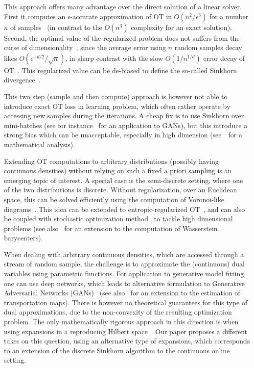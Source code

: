 This approach offers many advantage over the direct solution of a linear solver. First it computes an $\epsilon$-accurate approximation of OT in $O(n^2/\epsilon^3)$ for a number $n$ of samples~\cite{altschuler2017near} (in contrast to the $O(n^3)$ complexity for an exact solution). Second, the optimal value of the regularized problem does not suffers from the curse of dimensionality~\cite{2019-Genevay-aistats}, since the average error using $n$ random samples decay likes $O(\epsilon^{-d/2}/\sqrt{n})$, in sharp contrast with the slow $O(1/n^{1/d})$ error decay of OT~\cite{weed2019sharp}. This regularized value can be de-biased to define the so-called Sinkhorn divergence~\cite{2019-Feydy-aistats}.  

This two step (sample and then compute) approach is however not able to introduce exact OT loss in learning problem, which often rather operate by accessing new samples during the iterations. A cheap fix is to use Sinkhorn over mini-batches (see for instance~\cite{2018-Genevay-aistats} for an application to GANs), but this introduce a strong bias which can be unacceptable, especially in high dimension (see~\cite{fatras2019learning} for a mathematical analysis). 

Extending OT computations to arbitrary distributions (possibly having continuous densities) without relying on such a fixed a priori sampling is an emerging topic of interest. A special case is the semi-discrete setting, where one of the two distributions is discrete. Without regularization, over an Euclidean space, this can be solved efficiently using the computation of Voronoi-like diagrams~\cite{merigot2011multiscale}. This idea can be extended to entropic-regularized OT~\cite{cuturi2018semidual}, and can also be coupled with stochastic optimization method~\cite{2016-genevay-nips} to tackle high dimensional problems (see also~\cite{staib2017parallel} for an extension to the computation of Wasserstein barycenters). 

When dealing with arbitrary continuous densities, which are accessed through a stream of random sample, the challenge is to approximate  the (continuous) dual variables using parametric functions. For application to generative model fitting, one can use deep networks, which leads to alternative formulation to Generative Adversarial Networks (GANs)~\cite{arjovsky2017wgan} (see also~\cite{seguy2018large} for an extension to the estimation of transportation maps). 
%
There is however no theoretical guarantees for this type of dual approximations, due to the non-convexity of the resulting optimization problem. The only mathematically rigorous approach in this direction is when using expansions in a reproducing Hilbert space~\cite{2016-genevay-nips}. Our paper proposes a different takes on this question, using an alternative type of expansions, which corresponds to an extension of the discrete Sinkhorn algorithm to the continuous online setting.


